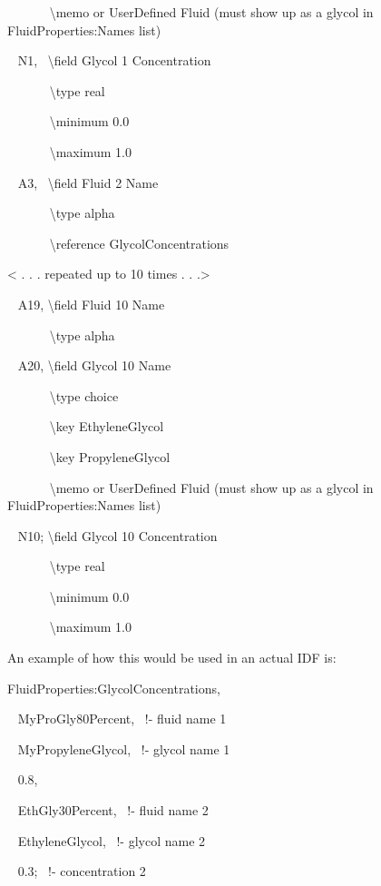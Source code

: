 ~~~~~~ \textbackslash{}memo or UserDefined Fluid (must show up as a glycol in FluidProperties:Names list)

~ N1,~ \textbackslash{}field Glycol 1 Concentration

~~~~~~ \textbackslash{}type real

~~~~~~ \textbackslash{}minimum 0.0

~~~~~~ \textbackslash{}maximum 1.0

~ A3,~ \textbackslash{}field Fluid 2 Name

~~~~~~ \textbackslash{}type alpha

~~~~~~ \textbackslash{}reference GlycolConcentrations

\textless{} . . . repeated up to 10 times . . .\textgreater{}

~ A19, \textbackslash{}field Fluid 10 Name

~~~~~~ \textbackslash{}type alpha

~ A20, \textbackslash{}field Glycol 10 Name

~~~~~~ \textbackslash{}type choice

~~~~~~ \textbackslash{}key EthyleneGlycol

~~~~~~ \textbackslash{}key PropyleneGlycol

~~~~~~ \textbackslash{}memo or UserDefined Fluid (must show up as a glycol in FluidProperties:Names list)

~ N10; \textbackslash{}field Glycol 10 Concentration

~~~~~~ \textbackslash{}type real

~~~~~~ \textbackslash{}minimum 0.0

~~~~~~ \textbackslash{}maximum 1.0

An example of how this would be used in an actual IDF is:

FluidProperties:GlycolConcentrations,

~ MyProGly80Percent,~ !- fluid name 1

~ MyPropyleneGlycol,~ !- glycol name 1

~ 0.8,

~ EthGly30Percent,~ !- fluid name 2

~ EthyleneGlycol,~ !- glycol name 2

~ 0.3;~ !- concentration 2

